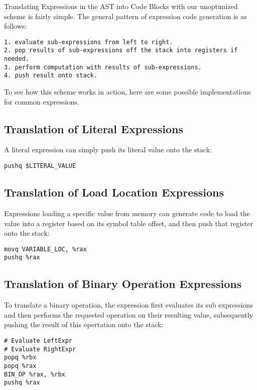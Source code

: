 \documentclass[11pt]{article}
\begin{document}
Translating Expressions in the AST into Code Blocks with our unoptimized scheme is fairly simple. The general pattern of expression code generation is as follows: 

\begin{verbatim}
1. evaluate sub-expressions from left to right.
2. pop results of sub-expressions off the stack into registers if needed.
3. perform computation with results of sub-expressions.
4. push result onto stack. 
\end{verbatim}

To see how this scheme works in action, here are some possible implementations for common expressions. 

\subsection{Translation of Literal Expressions} 

A literal expression can simply push its literal value onto the stack: 

\begin{verbatim} 
pushq $LITERAL_VALUE 
\end{verbatim}

\subsection{Translation of Load Location Expressions} 

Expressions loading a specific value from memory can generate code to load the value into a register based on its symbol table offset, and then push that register onto the stack: 

\begin{verbatim}
movq VARIABLE_LOC, %rax
pushq %rax
\end{verbatim}

\subsection{Translation of Binary Operation Expressions} 
To translate a binary operation, the expression first evaluates its sub expressions and then performs the requested operation on their resulting value, subsequently pushing the result of this opertation onto the stack: 

\begin{verbatim}
# Evaluate LeftExpr
# Evaluate RightExpr
popq %rbx
popq %rax
BIN_OP %rax, %rbx
pushq %rax
\end{verbatim}
\end{document}
